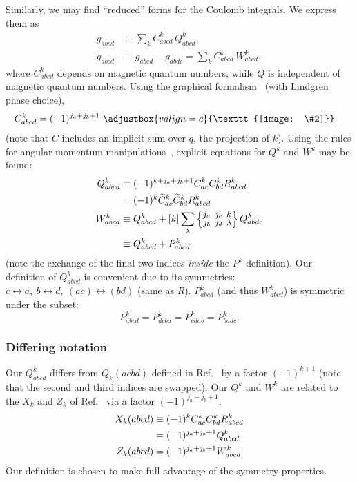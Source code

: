 \documentclass[10pt,twocolumn,a4paper]{article}%
\newcommand{\eqdiagram}[2]{\adjustbox{valign=c}{\texttt{[image: \#2]}}}
\newcommand{\bra}[1]{\ensuremath{\langle #1|}}	%
\newcommand{\ket}[1]{\ensuremath{|#1\rangle}}	%
\newcommand{\threej}[6]{
\renewcommand\arraystretch{0.75}\setlength\arraycolsep{2pt}
\small\ensuremath{\begin{pmatrix}#1&#2&#3\\#4&#5&#6\end{pmatrix}}
}	%
\newcommand{\sixj}[6]{\renewcommand\arraystretch{0.75}\setlength\arraycolsep{2pt}\small\ensuremath{\begin{Bmatrix}#1&#2&#3\\#4&#5&#6\end{Bmatrix}}}	%
\newcommand{\be}{\begin{equation}}
\newcommand{\ee}{\end{equation}}
\renewcommand{\k}{\ensuremath{\kappa}}
\begin{document}
Similarly, we may find ``reduced'' forms for the Coulomb integrals. We express them as
\begin{align}
g_{abcd} &\equiv \sum_{k} C^k_{abcd} \, Q^k_{abcd},\label{eq:g-angred-1}\\
\widetilde g_{abcd} &\equiv g_{abcd} - g_{abdc} = \sum_{k} C^k_{abcd} \, W^k_{abcd},\label{eq:g-angred-2}
\end{align}
where $C^k_{abcd}$ depends on magnetic quantum numbers, while $Q$ is independent of magnetic quantum numbers.
Using the graphical formalism~\cite{Lindgren1986} (with Lindgren phase choice),
\begin{align}
C^k_{abcd} &= (-1)^{j_a+j_b+1} \,\,\eqdiagram{0.16}{img/angles/Ck_abcd}
\end{align}
(note that $C$ includes an implicit sum over $q$, the projection of $k$).
Using the rules for angular momentum manipulations~\cite{Varshalovich1988,Lindgren1986}, explicit equations for $Q^k$ and $W^k$ may be found:
\begin{align}
Q^k_{abcd} &\equiv  (-1)^{k + j_a+j_b+1}C^k_{ac}C^k_{bd} R^k_{abcd} \notag\\
&= (-1)^k \widetilde C^k_{ac}\widetilde C^k_{bd}R^k_{abcd}\\
%
W^k_{abcd} &\equiv Q^k_{abcd} + [k] \sum_\lambda \sixj{j_a}{j_c}{k}{j_b}{j_d}{\lambda}Q^\lambda_{abdc} \notag\\
& \equiv Q^k_{abcd}  + P^k_{abcd}
\end{align}
(note the exchange of the final two indices {\em inside} the $P^k$ definition).
Our definition of $Q^k_{abcd}$  is convenient due to its symmetries: $c\leftrightarrow a ,~ b\leftrightarrow d  ,~ (ac)\leftrightarrow (bd)$ (same as $R$).
$P^k_{abcd}$ (and thus $W^k_{abcd}$) is symmetric under the subset:
\be
P^k_{abcd} = P^k_{dcba} = P^k_{cdab} = P^k_{badc}.
\ee
%

\subsubsection*{Differing notation}
Our $Q^k_{abcd}$ differs from $Q_k({acbd})$ defined in Ref.~\cite{DzubaHFS1984} by a factor $(-1)^{k+1}$ (note that the second and third indices are swapped).
Our $Q^k$ and $W^k$ are related to the $X_k$ and $Z_k$ of Ref.~\cite{Lindgren1986,JohnsonBook2007} via a factor $(-1)^{j_a+j_b+1}$:
\begin{align}
X_k({abcd}) &\equiv  (-1)^k C^k_{ac}C^k_{bd} R^k_{abcd} \notag\\
 & = (-1)^{j_a+j_b+1}Q^k_{abcd}\\
 Z_k({abcd}) &=  (-1)^{j_a+j_b+1} W^k_{abcd}
\end{align}
Our definition is chosen to make full advantage of the symmetry properties.
\end{document}
